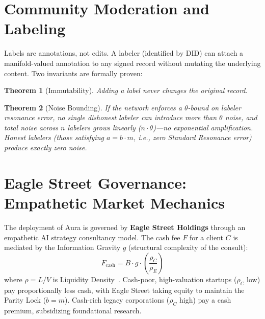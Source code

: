 \documentclass[12pt,a4paper]{article}
\newtheorem{theorem}{Theorem}[section]
\begin{document}
\section{Community Moderation and Labeling}
\label{sec:moderation}

Labels are annotations, not edits. A labeler (identified by DID) can attach a manifold-valued annotation to any signed record without mutating the underlying content. Two invariants are formally proven:

\begin{theorem}[Immutability]
Adding a label never changes the original record.
\end{theorem}

\begin{theorem}[Noise Bounding]
If the network enforces a $\theta$-bound on labeler resonance error, no single dishonest labeler can introduce more than $\theta$ noise, and total noise across $n$ labelers grows linearly ($n \cdot \theta$)---no exponential amplification. Honest labelers (those satisfying $a = b \cdot m$, i.e., zero Standard Resonance error) produce exactly zero noise.
\end{theorem}

\section{Eagle Street Governance: Empathetic Market Mechanics}
\label{sec:eagle-street}

The deployment of Aura is governed by \textbf{Eagle Street Holdings} through an empathetic AI strategy consultancy model. The cash fee $F$ for a client $C$ is mediated by the Information Gravity $g$ (structural complexity of the consult):
\begin{equation}
F_{\mathrm{cash}} = B \cdot g \cdot \left( \frac{\rho_C}{\rho_E} \right)
\end{equation}
where $\rho = L / V$ is Liquidity Density~\cite{PP-I-Ch15}. Cash-poor, high-valuation startups ($\rho_C$ low) pay proportionally less cash, with Eagle Street taking equity to maintain the Parity Lock ($b = m$). Cash-rich legacy corporations ($\rho_C$ high) pay a cash premium, subsidizing foundational research.

\end{document}
